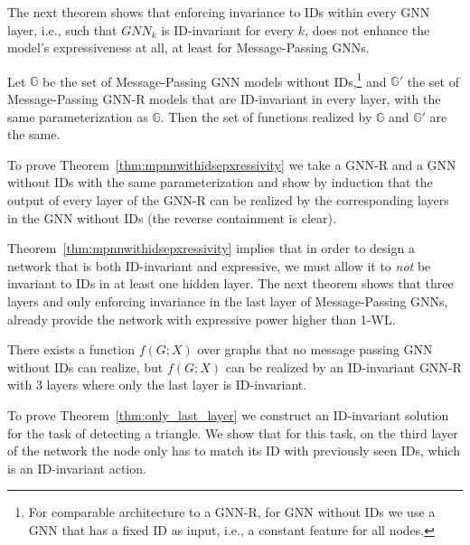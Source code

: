 The next theorem shows that enforcing invariance to IDs within every GNN layer, i.e., such that $GNN_k$ is ID-invariant for every $k$,  does not enhance the model's expressiveness at all, at least for Message-Passing GNNs.

\begin{theorem}\label{thm:mpnnwithidsepxressivity}
Let $\mathbb{G}$ be the set of Message-Passing GNN models without IDs,\footnote{For comparable architecture to a GNN-R, for GNN without IDs we use a GNN that has a fixed ID as input, i.e., a constant feature for all nodes.} and $\mathbb{G}'$ the set of Message-Passing GNN-R models that are ID-invariant in every layer, with the same parameterization as $\mathbb{G}$. Then the set of functions realized by $\mathbb{G}$ and $\mathbb{G}'$ are the same.
\end{theorem}

To prove Theorem~\ref{thm:mpnnwithidsepxressivity} we take a GNN-R and a GNN without IDs with the same parameterization and show by induction that the output of every layer of the GNN-R can be realized by the corresponding layers in the GNN without IDs (the reverse containment is clear).

Theorem~\ref{thm:mpnnwithidsepxressivity} implies that in order to design a network that is both ID-invariant and expressive, we must allow it to {\em not} be invariant to IDs in at least one hidden layer.
The next theorem shows that three layers and only enforcing invariance in the last layer of Message-Passing GNNs, already provide the network with expressive power higher than 1-WL.
\begin{theorem}\label{thm:only_last_layer}
There exists a function $f(G;X)$ over graphs that no message passing GNN without IDs can realize, but $f(G;X)$ can be realized by an ID-invariant GNN-R with $3$ layers where only the last layer is ID-invariant.
\end{theorem}

To prove Theorem~\ref{thm:only_last_layer} we construct an ID-invariant solution for the task of detecting a triangle. We show that for this task, on the third layer of the network the node only has to match its ID with previously seen IDs, which is an ID-invariant action.



